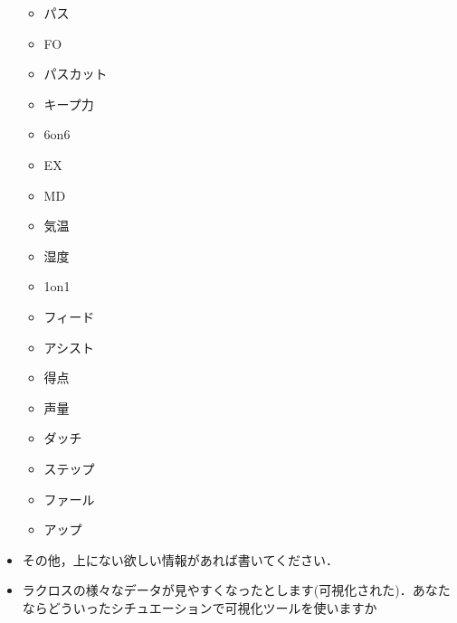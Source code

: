 \documentclass[sotsuron]{kuee}
\begin{document}
\begin{itemize}
\begin{itemize}
				\item パス
				\item FO
				\item パスカット
				\item キープ力
				\item 6on6
				\item EX
				\item MD
				\item 気温
				\item 湿度
				\item 1on1
				\item フィード
				\item アシスト
				\item 得点
				\item 声量
				\item ダッチ
				\item ステップ
				\item ファール
				\item アップ
			\end{itemize}
		\item その他，上にない欲しい情報があれば書いてください．
		\item ラクロスの様々なデータが見やすくなったとします(可視化された)．あなたならどういったシチュエーションで可視化ツールを使いますか
	\end{itemize}
\end{document}
